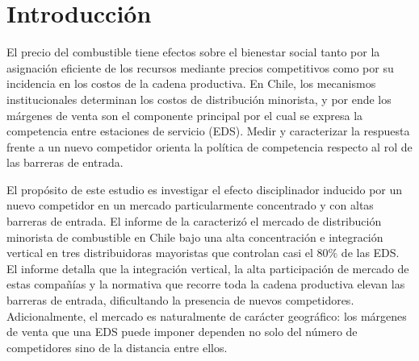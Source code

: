 \section{Introducción}

El precio del combustible tiene efectos sobre el bienestar social tanto por la asignación eficiente de los recursos mediante precios competitivos como por su incidencia en los costos de la cadena productiva. En Chile, los mecanismos institucionales determinan los costos de distribución minorista, y por ende los márgenes de venta son el componente principal por el cual se expresa la competencia entre estaciones de servicio (EDS). Medir y caracterizar la respuesta frente a un nuevo competidor orienta la política de competencia respecto al rol de las barreras de entrada.

El propósito de este estudio es investigar el efecto disciplinador inducido por un nuevo competidor en un mercado particularmente concentrado y con altas barreras de entrada. El informe de la \textcite{FNE2025informe} caracterizó el mercado de distribución minorista de combustible en Chile bajo una alta concentración e integración vertical en tres distribuidoras mayoristas que controlan casi el $80\%$ de las EDS. El informe detalla que la integración vertical, la alta participación de mercado de estas compañías y la normativa que recorre toda la cadena productiva elevan las barreras de entrada, dificultando la presencia de nuevos competidores. Adicionalmente, el mercado es naturalmente de carácter geográfico: los márgenes de venta que una EDS puede imponer dependen no solo del número de competidores sino de la distancia entre ellos.

